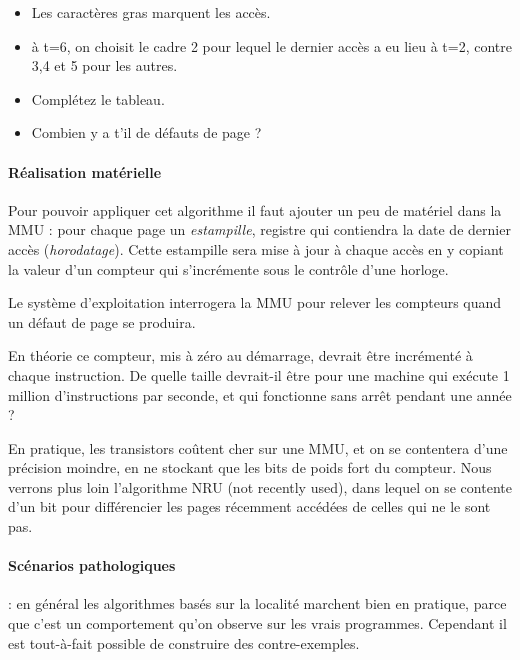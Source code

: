 \begin{multicols}{2}
\begin{itemize}
\item Les caractères gras marquent les accès.
\item à t=6, on choisit le cadre 2 pour lequel le dernier accès a eu
  lieu à t=2, contre 3,4 et 5 pour les autres.
\end{itemize}


\begin{exercice}
\begin{itemize}
\item Complétez le tableau.
\item Combien y a t'il de défauts de page ?
\end{itemize}
\end{exercice}




\paragraph{Réalisation matérielle}

Pour pouvoir appliquer cet algorithme il faut ajouter un peu de
matériel dans la MMU : pour chaque page un \emph{estampille}, registre
qui contiendra la date de dernier accès (\emph{horodatage}). Cette estampille sera mise à jour à chaque accès en y
copiant la valeur d'un compteur qui s'incrémente sous le contrôle
d'une horloge.

Le système d'exploitation interrogera la MMU pour relever les compteurs quand 
un défaut de page se produira.

\begin{exercice}
En théorie ce compteur, mis à zéro au démarrage, devrait être
incrémenté à chaque instruction. De quelle taille devrait-il être pour
une machine qui exécute 1 million d'instructions par seconde, et qui
fonctionne sans arrêt pendant une année ?
\end{exercice}

En pratique, les transistors coûtent cher sur une MMU, et on se
contentera d'une précision moindre, en ne stockant que les bits de
poids fort du compteur.  Nous verrons plus loin l'algorithme NRU (not
recently used), dans lequel on se contente d'un bit pour différencier
les pages récemment accédées de celles qui ne le sont pas.

\paragraph{Scénarios pathologiques} : en général
les algorithmes basés sur la localité marchent bien en pratique, parce
que c'est un comportement qu'on observe sur les vrais programmes.
Cependant il est tout-à-fait possible de construire des
contre-exemples.


\end{multicols}
